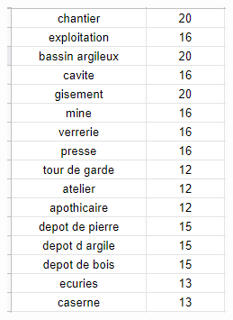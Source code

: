 \documentclass[12pt]{article}
\begin{document}
    	\begin{figure}[htbp]
    	    \centering
    	    \begin{subfigure}{.3\textwidth}
                \includegraphics[width=.9\linewidth]{images/notation_cartes.PNG}
    	    \end{subfigure}
    	    \begin{subfigure}{.3\textwidth}

\end{subfigure}
\end{figure}
\end{document}
